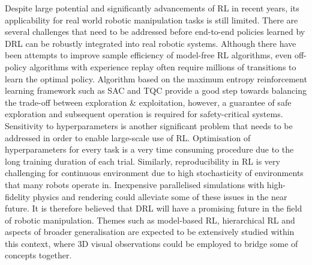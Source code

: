 Despite large potential and significantly advancements of RL in recent years, its applicability for real world robotic manipulation tasks is still limited. There are several challenges that need to be addressed before end-to-end policies learned by DRL can be robustly integrated into real robotic systems. Although there have been attempts to improve sample efficiency of model-free RL algorithms, even off-policy algorithms with experience replay often require millions of transitions to learn the optimal policy. Algorithm based on the maximum entropy reinforcement learning framework such as SAC and TQC provide a good step towards balancing the trade-off between exploration \& exploitation, however, a guarantee of safe exploration and subsequent operation is required for safety-critical systems. Sensitivity to hyperparameters is another significant problem that needs to be addressed in order to enable large-scale use of RL. Optimisation of hyperparameters for every task is a very time consuming procedure due to the long training duration of each trial. Similarly, reproducibility in RL is very challenging for continuous environment due to high stochasticity of environments that many robots operate in. Inexpensive parallelised simulations with high-fidelity physics and rendering could alleviate some of these issues in the near future. It is therefore believed that DRL will have a promising future in the field of robotic manipulation. Themes such as model-based RL, hierarchical RL and aspects of broader generalisation are expected to be extensively studied within this context, where 3D visual observations could be employed to bridge some of concepts together.
